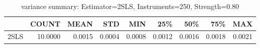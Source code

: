 \begin{table}[ht]
\centering
\caption{variance summary: Estimator=2SLS, Instruments=250, Strength=0.80}
\begin{tabular}{lrrrrrrrr}
\toprule
 & COUNT & MEAN & STD & MIN & 25\% & 50\% & 75\% & MAX \\
\midrule
2SLS & 10.0000 & 0.0015 & 0.0004 & 0.0008 & 0.0012 & 0.0016 & 0.0018 & 0.0021 \\
\bottomrule
\end{tabular}
\end{table}
